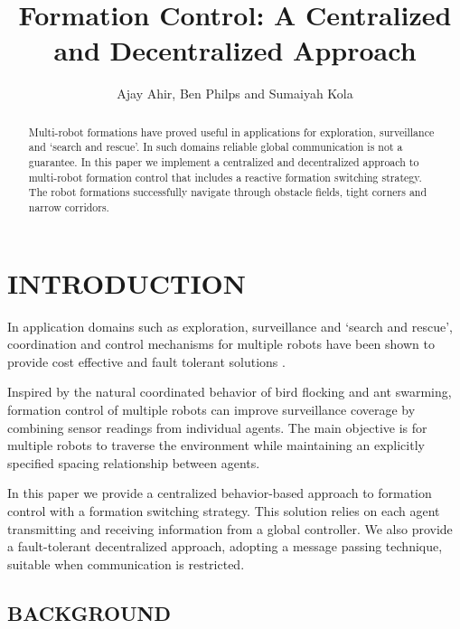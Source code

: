 \documentclass[letterpaper, 10 pt, conference]{ieeeconf}  %
\title{\LARGE \bf Formation Control: A Centralized and Decentralized Approach}
\author{Ajay Ahir, Ben Philps and Sumaiyah Kola}
\begin{document}
\maketitle
\thispagestyle{empty}
\pagestyle{empty}

\begin{abstract}
	
Multi-robot formations have proved useful in applications for exploration, surveillance and `search and rescue'. In such domains reliable global communication is not a guarantee. In this paper we implement a centralized and decentralized approach to multi-robot formation control that includes a reactive formation switching strategy. The robot formations successfully navigate through obstacle fields, tight corners and narrow corridors.

\end{abstract}
	
\section{INTRODUCTION}
	
In application domains such as exploration, surveillance and `search and rescue', coordination and control mechanisms for multiple robots have been shown to provide cost effective and fault tolerant solutions \cite{c1}.

Inspired by the natural coordinated behavior of bird flocking and ant swarming, formation control of multiple robots can improve surveillance coverage by combining sensor readings from individual agents. The main objective is for multiple robots to traverse the environment while maintaining an explicitly specified spacing relationship between agents.

In this paper we provide a centralized behavior-based approach to formation control with a formation switching strategy. This solution relies on each agent transmitting and receiving information from a global controller. We also provide a fault-tolerant decentralized approach, adopting a message passing technique, suitable when communication is restricted.
\subsection{BACKGROUND}
\label{background}
\end{document}
